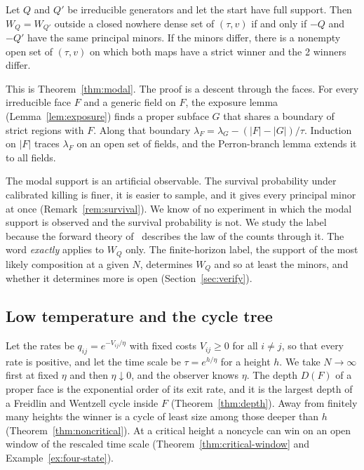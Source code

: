 \begin{introtheorem}\label{thm:B}
Let $Q$ and $Q'$ be irreducible generators and let the start have full support. Then $W_Q=W_{Q'}$
outside a closed nowhere dense set of $(\tau,v)$ if and only if $-Q$ and $-Q'$ have the same
principal minors. If the minors differ, there is a nonempty open set of $(\tau,v)$ on which both
maps have a strict winner and the 2 winners differ.
\end{introtheorem}

This is Theorem~\ref{thm:modal}. The proof is a descent through the faces. For every irreducible
face $F$ and a generic field on $F$, the exposure lemma (Lemma~\ref{lem:exposure}) finds a proper
subface $G$ that shares a boundary of strict regions with $F$. Along that boundary
$\lambda_F=\lambda_G-(|F|-|G|)/\tau$. Induction on $|F|$ traces $\lambda_F$ on an open set of
fields, and the Perron-branch lemma extends it to all fields.

The modal support is an artificial observable. The survival probability under calibrated killing
is finer, it is easier to sample, and it gives every principal minor at once
(Remark~\ref{rem:survival}). We know of no experiment in which the modal support is observed and
the survival probability is not. We study the label because the forward theory
of~\cite{paperC1} describes the law of the counts through it. The word \emph{exactly} applies to
$W_Q$ only. The finite-horizon label, the support of the most likely composition at a given $N$,
determines $W_Q$ and so at least the minors, and whether it determines more is open
(Section~\ref{sec:verify}).

\subsection{Low temperature and the cycle tree}\label{sec:intro-lowtemp}

Let the rates be $q_{ij}=e^{-V_{ij}/\eta}$ with fixed costs $V_{ij}\ge0$ for all $i\ne j$, so that
every rate is positive, and let the time scale be $\tau=e^{h/\eta}$ for a height $h$. We take
$N\to\infty$ first at fixed $\eta$ and then $\eta\downarrow0$, and the observer knows $\eta$. The
depth $D(F)$ of a proper face is the exponential order of its exit rate, and it is the largest
depth of a Freidlin and Wentzell cycle inside $F$ (Theorem~\ref{thm:depth}). Away from finitely
many heights the winner is a cycle of least size among those deeper than $h$
(Theorem~\ref{thm:noncritical}). At a critical height a noncycle can win on an open window of the
rescaled time scale (Theorem~\ref{thm:critical-window} and Example~\ref{ex:four-state}).

